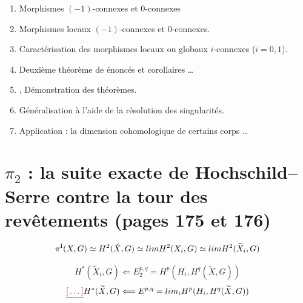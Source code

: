 \documentclass[11pt,a4paper]{article}
\begin{document}
\begin{enumerate}
\item Morphismes $(-1)$-connexes et $0$-connexes
\item Morphismes locaux $(-1)$-connexes et $0$-connexes.
\item {} Caractérisation des morphismes locaux ou globaux
$i$-connexes ($i = 0,1$).
\item {} Deuxième théorème de 
 énoncés et corollaires \ldots
\item \struck{\ill{}},  Démonstration des théorèmes.
\item Généralisation à l'aide de la résolution des singularités.
\item Application : la dimension cohomologique de certains corps \ldots
\end{enumerate}

\section*{$\pi_2$ : la suite exacte de Hochschild--Serre contre la tour des revêtements (pages 175 et 176)}





\[
  \pi^{\mathrm{I}}(X,G) \simeq H^2(\check{X},G) \simeq \varinjlim H^2(X_i,G)
  \simeq \varinjlim H^2(\widetilde{X}_i,G)
\]


\[
  H^*(\widetilde{X}_i,G) \Longleftarrow E_2^{p,q} = H^p(H_i, H^q(\widetilde{X},G))
\]
\[
  \struck{\ill{}} H^*(\widetilde{X},G) \Longleftarrow E^{p,q} =
  \varinjlim_i H^p(H_i, H^q(\widetilde{X},G))
\]
\end{document}
